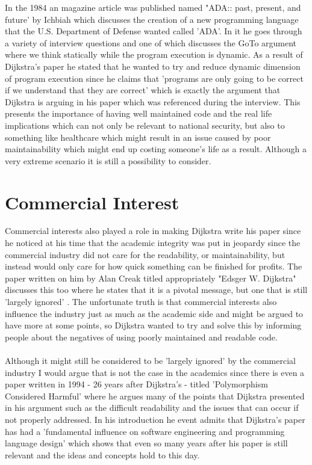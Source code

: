 \documentclass{article}
\begin{document}
In the 1984 an magazine article was published named "ADA:: past, present, and future' by Ichbiah \cite{Ichbiah:1984:APP:358274.358278} which discusses the creation of a new programming language that the U.S. Department of Defense wanted called 'ADA'. In it he goes through a variety of interview questions and one of which discusses the GoTo argument where we think statically while the program execution is dynamic. As a result of Dijkstra's paper he stated that he wanted to try and reduce dynamic dimension of program execution since he claims that 'programs are only going to be correct if we understand that they are correct' \cite{Ichbiah:1984:APP:358274.358278} which is exactly the argument that Dijkstra is arguing in his paper which was referenced during the interview. This presents the importance of having well maintained code and the real life implications which can not only be relevant to national security, but also to something like healthcare which might result in an issue caused by poor maintainability which might end up costing someone's life as a result. Although a very extreme scenario it is still a possibility to consider.


\section{Commercial Interest}
Commercial interests also played a role in making Dijkstra write his paper since he noticed at his time that the academic integrity was put in jeopardy since the commercial industry did not care for the readability, or maintainability, but instead would only care for how quick something can be finished for profits. The paper written on him by Alan Creak titled appropriately "Edsger W. Dijkstra" \cite{Creak:2002:EWD:636517.636521} discusses this too where he states that it is a pivotal message, but one that is still 'largely ignored' \cite{Creak:2002:EWD:636517.636521}. The unfortunate truth is that commercial interests also influence the industry just as much as the academic side and might be argued to have more at some points, so Dijkstra wanted to try and solve this by informing people about the negatives of using poorly maintained and readable code.
\\
\\
Although it might still be considered to be 'largely ignored' \cite{Creak:2002:EWD:636517.636521} by the commercial industry I would argue that is not the case in the academics since there is even a paper written in 1994 - 26 years after Dijkstra's - titled 'Polymorphism Considered Harmful' \cite{Ponder:1992:PCH:130981.130991} where he argues many of the points that Dijkstra presented in his argument such as the difficult readability and the issues that can occur if not properly addressed. In his introduction he event admits that Dijkstra's paper has had a 'fundamental influence on software engineering and programming language design' \cite{Ponder:1992:PCH:130981.130991} which shows that even so many years after his paper is still relevant and the ideas and concepts hold to this day.
\\
\end{document}
